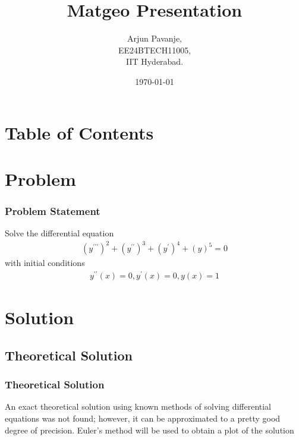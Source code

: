 \documentclass{beamer}
\title{Matgeo Presentation}
\author{Arjun Pavanje,\\ EE24BTECH11005,\\IIT Hyderabad.\\}
\date{\today}
\providecommand{\brak}[1]{\ensuremath{\left(#1\right)}}
\theoremstyle{remark}
\numberwithin{equation}{section}
\begin{document}
		\begin{frame}
			\titlepage
		\end{frame}

		\section*{Table of Contents}
		\begin{frame}
			\tableofcontents
		\end{frame}
		\section{Problem}
		\begin{frame}
			\frametitle{Problem Statement}

      Solve the differential equation 
\begin{align}
  \brak{y^{\prime \prime \prime}}^2 + \brak{y^{\prime \prime}}^3 + \brak{y^{\prime}}^4 + \brak{y}^5 = 0 
\end{align}
    with initial conditions 
      \begin{align}
        y^{\prime \prime}\brak{x}=0, y^{\prime}\brak{x}=0, y\brak{x}=1
      \end{align}
		\end{frame}
		\section{Solution}
		\subsection{Theoretical Solution}
		\begin{frame}
      \frametitle{Theoretical Solution}
An exact theoretical solution using known methods of solving differential equations was not found; however, it can be approximated to a pretty good degree of precision. Euler's method will be used to obtain a plot of the solution\\		\end{frame}
\end{document}
